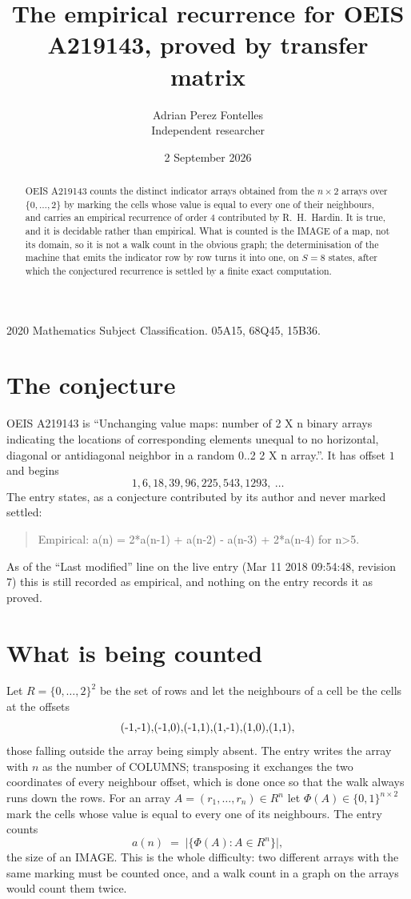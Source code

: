 \documentclass[11pt,a4paper]{article}
\title{The empirical recurrence for OEIS A219143, proved by transfer matrix}
\author{Adrian Perez Fontelles\\ \small Independent researcher}
\date{2 September 2026}
\theoremstyle{plain}
\theoremstyle{definition}
\begin{document}
\maketitle

\begin{abstract}
OEIS A219143 counts the distinct indicator arrays obtained from the $n\times2$ arrays over
$\{0,\dots,2\}$ by marking the cells whose value is equal to every one of their neighbours, and carries an
empirical recurrence of order $4$ contributed by R.~H.~Hardin. It is true, and it is
decidable rather than empirical. What is counted is the IMAGE of a map, not its domain, so it
is not a walk count in the obvious graph; the determinisation of the machine that emits the
indicator row by row turns it into one, on $S=8$ states, after which the conjectured
recurrence is settled by a finite exact computation.
\end{abstract}

\noindent\small 2020 Mathematics Subject Classification. 05A15, 68Q45, 15B36.\normalsize

\section{The conjecture}

OEIS A219143 is ``Unchanging value maps: number of 2 X n binary arrays indicating the locations of corresponding elements unequal to no horizontal, diagonal or antidiagonal neighbor in a random 0..2 2 X n array.''. It has offset $1$ and begins
\[
1, 6, 18, 39, 96, 225, 543, 1293,\ \dots
\]
The entry states, as a conjecture contributed by its author and never marked settled:
\begin{quote}
Empirical: a(n) = 2*a(n-1) + a(n-2) - a(n-3) + 2*a(n-4) for n>5.
\end{quote}
As of the ``Last modified'' line on the live entry (Mar 11 2018 09:54:48, revision 7) this is still
recorded as empirical, and nothing on the entry records it as proved.

\section{What is being counted}

Let $R=\{0,\dots,2\}^{2}$ be the set of rows and let the neighbours of a cell be the
cells at the offsets
\[
$(-1,-1)$, $(-1,0)$, $(-1,1)$, $(1,-1)$, $(1,0)$, $(1,1)$,
\]
those falling outside the array being simply absent. The entry writes the array with $n$ as the number of COLUMNS; transposing it exchanges the two coordinates of every neighbour offset, which is done once so that the walk always runs down the rows. For an array
$A=(r_1,\dots,r_n)\in R^n$ let $\Phi(A)\in\{0,1\}^{n\times2}$ mark the cells whose value
is equal to every one of its neighbours. The entry counts
\[
a(n)\;=\;\bigl|\{\Phi(A):A\in R^n\}\bigr| ,
\]
the size of an IMAGE. This is the whole difficulty: two different arrays with the same marking
must be counted once, and a walk count in a graph on the arrays would count them twice.
\end{document}
